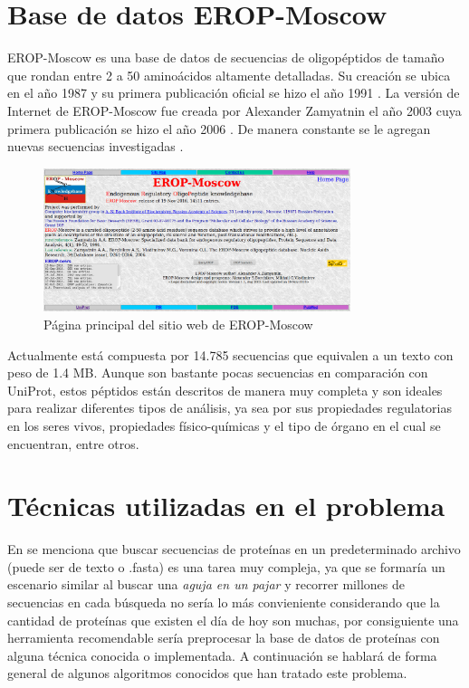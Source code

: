 \section{Base de datos EROP-Moscow}

EROP-Moscow es una base de datos de secuencias de oligopéptidos de tamaño que rondan entre 2 a 50 aminoácidos altamente detalladas. Su creación se ubica en el año 1987 y su primera publicación oficial se hizo el año 1991 \cite{erop2}. La versión de Internet de EROP-Moscow fue creada por Alexander Zamyatnin el año 2003 cuya primera publicación se hizo el año 2006 \cite{erop3}. De manera constante se le agregan nuevas secuencias investigadas \cite{eropmoscow}.

\begin{figure}[h]
    \centering
    \includegraphics[width=0.8\textwidth]{./images/eropmoscow_main.png}
    \caption{Página principal del sitio web de EROP-Moscow}
    \label{fig:image8}
\end{figure}

Actualmente está compuesta por 14.785 secuencias que equivalen a un texto con peso de 1.4 MB. Aunque son bastante pocas secuencias en comparación con UniProt, estos péptidos están descritos de manera muy completa y son ideales para realizar diferentes tipos de análisis, ya sea por sus propiedades regulatorias en los seres vivos, propiedades físico-químicas y el tipo de órgano en el cual se encuentran, entre otros.

\section{Técnicas utilizadas en el problema}

En \cite{searching} se menciona que buscar secuencias de proteínas en un predeterminado archivo (puede ser de texto o .fasta) es una tarea muy compleja, ya que se formaría un escenario similar al buscar una {\textit{aguja en un pajar}} y recorrer millones de secuencias en cada búsqueda no sería lo más convieniente considerando que la cantidad de proteínas que existen el día de hoy son muchas, por consiguiente una herramienta recomendable sería preprocesar la base de datos de proteínas con alguna técnica conocida o implementada. A continuación se hablará de forma general de algunos algoritmos conocidos que han tratado este problema.

